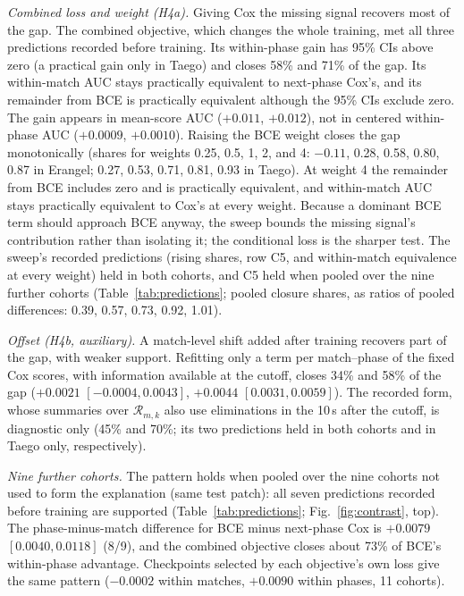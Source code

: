 \documentclass[sigconf,anonymous]{acmart}
\begin{document}
\emph{Combined loss and weight (H4a).} Giving Cox the missing signal recovers most of the gap. The combined objective, which changes the whole training, met all three predictions recorded before training. Its within-phase gain has 95\% CIs above zero (a practical gain only in Taego) and closes 58\% and 71\% of the gap. Its within-match AUC stays practically equivalent to next-phase Cox's, and its remainder from BCE is practically equivalent although the 95\% CIs exclude zero. The gain appears in mean-score AUC ($+0.011$, $+0.012$), not in centered within-phase AUC ($+0.0009$, $+0.0010$). Raising the BCE weight closes the gap monotonically (shares for weights 0.25, 0.5, 1, 2, and 4: $-0.11$, 0.28, 0.58, 0.80, 0.87 in Erangel; 0.27, 0.53, 0.71, 0.81, 0.93 in Taego). At weight 4 the remainder from BCE includes zero and is practically equivalent, and within-match AUC stays practically equivalent to Cox's at every weight. Because a dominant BCE term should approach BCE anyway, the sweep bounds the missing signal's contribution rather than isolating it; the conditional loss is the sharper test. The sweep's recorded predictions (rising shares, row C5, and within-match equivalence at every weight) held in both cohorts, and C5 held when pooled over the nine further cohorts (Table~\ref{tab:predictions}; pooled closure shares, as ratios of pooled differences: 0.39, 0.57, 0.73, 0.92, 1.01).

\emph{Offset (H4b, auxiliary).} A match-level shift added after training recovers part of the gap, with weaker support. Refitting only a term per match--phase of the fixed Cox scores, with information available at the cutoff, closes 34\% and 58\% of the gap ($+0.0021$ $[-0.0004,\allowbreak 0.0043]$, $+0.0044$ $[0.0031,\allowbreak 0.0059]$). The recorded form, whose summaries over $\mathcal{R}_{m,k}$ also use eliminations in the 10\,s after the cutoff, is diagnostic only (45\% and 70\%; its two predictions held in both cohorts and in Taego only, respectively).


\emph{Nine further cohorts.} The pattern holds when pooled over the nine cohorts not used to form the explanation (same test patch): all seven predictions recorded before training are supported (Table~\ref{tab:predictions}; Fig.~\ref{fig:contrast}, top). The phase-minus-match difference for BCE minus next-phase Cox is $+0.0079$ $[0.0040,\allowbreak 0.0118]$ (8/9), and the combined objective closes about 73\% of BCE's within-phase advantage. Checkpoints selected by each objective's own loss give the same pattern ($-0.0002$ within matches, $+0.0090$ within phases, 11 cohorts).
\end{document}
